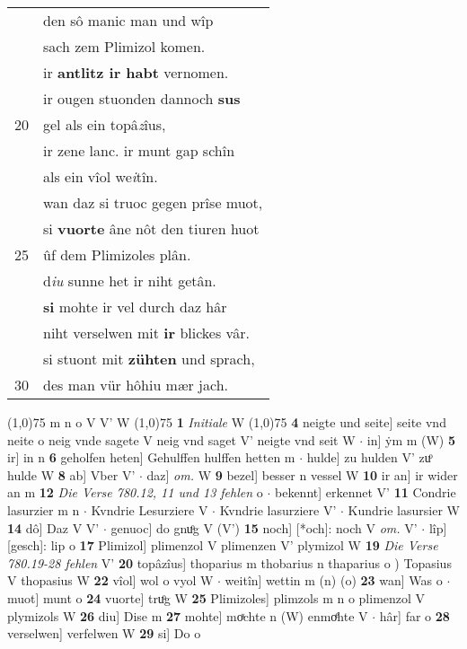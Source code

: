 \documentclass[8pt,a4paper,notitlepage]{article}
\begin{document}
\begin{table}[ht]
\begin{minipage}[t]{0.5\linewidth}
\begin{tabular}{rl}
 & den sô manic man und wîp\\ 
 & sach zem Plimizol komen.\\ 
 & ir \textbf{antlitz ir habt} vernomen.\\ 
 & ir ougen stuonden dannoch \textbf{sus}\\ 
20 & gel als ein topâ\textit{z}îus,\\ 
 & ir zene lanc. ir munt gap schîn\\ 
 & als ein vîol we\textit{i}tîn.\\ 
 & wan daz si truoc gegen prîse muot,\\ 
 & si \textbf{vuorte} âne nôt den tiuren huot\\ 
25 & ûf dem Plimizoles plân.\\ 
 & d\textit{iu} sunne het ir niht getân.\\ 
 & \textbf{si} mohte ir vel durch daz hâr\\ 
 & niht verselwen mit \textbf{ir} blickes vâr.\\ 
 & si stuont mit \textbf{zühten} und sprach,\\ 
30 & des man vür hôhiu mær jach.\\ 
\end{tabular}
\scriptsize
\line(1,0){75} \newline
m n o V V' W \newline
\line(1,0){75} \newline
\textbf{1} \textit{Initiale} W  \newline
\line(1,0){75} \newline
\textbf{4} neigte und seite] seite vnd neite o neig vnde sagete V neig vnd saget V' neigte vnd seit W  $\cdot$ in] ẏm m (W) \textbf{5} ir] in n \textbf{6} geholfen heten] Gehulffen hulffen hetten m  $\cdot$ hulde] zu hulden V' zuͦ hulde W \textbf{8} ab] Vber V'  $\cdot$ daz] \textit{om.} W \textbf{9} bezel] besser n vessel W \textbf{10} ir an] ir wider an m \textbf{12} \textit{Die Verse 780.12, 11 und 13 fehlen} o   $\cdot$ bekennt] erkennet V' \textbf{11} Condrie lasurzier m n  $\cdot$ Kvndrie Lesurziere V  $\cdot$ Kvndrie lasurziere V'  $\cdot$ Kundrie lasursier W \textbf{14} dô] Daz V V'  $\cdot$ genuoc] do gnuͦg V (V') \textbf{15} noch] [*och]: noch V \textit{om.} V'  $\cdot$ lîp] [gesch]: lip o \textbf{17} Plimizol] plimenzol V plimenzen V' plymizol W \textbf{19} \textit{Die Verse 780.19-28 fehlen} V'  \textbf{20} topâzîus] thoparius m thobarius n thaparius o ) Topasius V thopasius W \textbf{22} vîol] wol o vyol W  $\cdot$ weitîn] wettin m (n) (o) \textbf{23} wan] Was o  $\cdot$ muot] munt o \textbf{24} vuorte] truͦg W \textbf{25} Plimizoles] plimzols m n o plimenzol V plymizols W \textbf{26} diu] Dise m \textbf{27} mohte] moͯchte n (W) enmoͤhte V  $\cdot$ hâr] far o \textbf{28} verselwen] verfelwen W \textbf{29} si] Do o \newline
\end{minipage}
\end{table}
\end{document}
